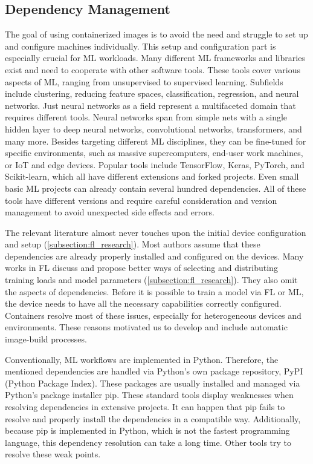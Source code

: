\subsection{Dependency Management}

The goal of using containerized images is to avoid the need and struggle to set up and configure machines individually.
This setup and configuration part is especially crucial for ML workloads.
Many different ML frameworks and libraries exist and need to cooperate with other software tools.
These tools cover various aspects of ML, ranging from unsupervised to supervised learning.
Subfields include clustering, reducing feature spaces, classification, regression, and neural networks.
Just neural networks as a field represent a multifaceted domain that requires different tools.
Neural networks span from simple nets with a single hidden layer to deep neural networks, convolutional networks, transformers, and many more.
Besides targeting different ML disciplines, they can be fine-tuned for specific environments, such as massive supercomputers, end-user work machines, or IoT and edge devices.
Popular tools include TensorFlow, Keras, PyTorch, and Scikit-learn, which all have different extensions and forked projects.
Even small basic ML projects can already contain several hundred dependencies.
All of these tools have different versions and require careful consideration and version management to avoid unexpected side effects and errors.

The relevant literature almost never touches upon the initial device configuration and setup (\ref{subsection:fl_research}).
Most authors assume that these dependencies are already properly installed and configured on the devices.
Many works in FL discuss and propose better ways of selecting and distributing training loads and model parameters (\ref{subsection:fl_research}).
They also omit the aspects of dependencies.
Before it is possible to train a model via FL or ML, the device needs to have all the necessary capabilities correctly configured.
Containers resolve most of these issues, especially for heterogeneous devices and environments.
These reasons motivated us to develop and include automatic image-build processes.

Conventionally, ML workflows are implemented in Python.
Therefore, the mentioned dependencies are handled via Python's own package repository, PyPI (Python Package Index).
These packages are usually installed and managed via Python's package installer pip.
These standard tools display weaknesses when resolving dependencies in extensive projects.
It can happen that pip fails to resolve and properly install the dependencies in a compatible way.
Additionally, because pip is implemented in Python, which is not the fastest programming language, this dependency resolution can take a long time.
Other tools try to resolve these weak points.

